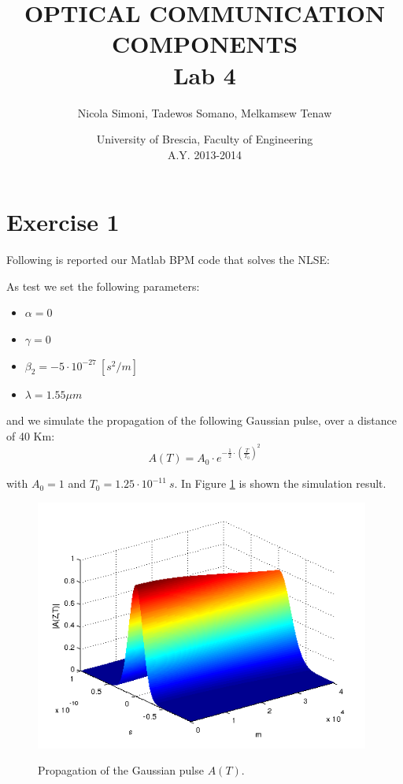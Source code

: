 \documentclass[a4paper,10pt]{report}
\title{\textbf{OPTICAL COMMUNICATION COMPONENTS \\ Lab 4}}
\author{Nicola Simoni, Tadewos Somano, Melkamsew Tenaw}
\date{University of Brescia, Faculty of Engineering\\A.Y. 2013-2014}
\begin{document}
\maketitle


\section*{Exercise 1}
Following is reported our Matlab BPM code that solves the NLSE:

As test we set the following parameters:
\begin{itemize}
 \item $\alpha = 0$
 \item $\gamma = 0$
 \item $\beta_2 = -5 \cdot 10^{-27} \ [s^2/m]$
 \item $\lambda = 1.55 \mu m$
\end{itemize}
and we simulate the propagation of the following Gaussian pulse, over a distance of 40 Km:
\begin{equation}\label{pulse}
A(T)=A_0 \cdot e^{-\frac{1}{2}\cdot (\frac{T}{T_0})^2}
\end{equation}

with $A_0=1$ and $T_0=1.25 \cdot 10^{-11} \ s$.
In Figure \ref{es1} is shown the simulation result.

\begin{figure}[!ht]
  \centering
  \includegraphics[width=11cm]{es1.png}\\
  \caption{Propagation of the Gaussian pulse $A(T)$.}
  \label{es1}
\end{figure}

\newpage
\end{document}

